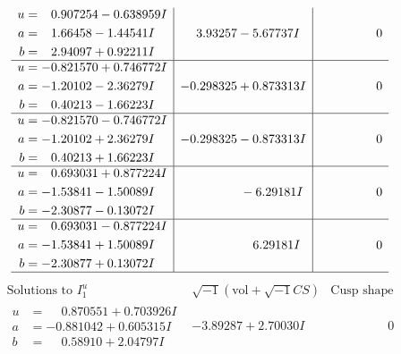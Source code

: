 \documentclass[1p]{elsarticle_modified}
\theoremstyle{definition}
\newcommand{\I}{\sqrt{-1}}
\begin{document}
$$\begin{array}{c|c|c}
\begin{aligned}
u &= \phantom{-}0.907254 - 0.638959 I \\
a &= \phantom{-}1.66458 - 1.44541 I \\
b &= \phantom{-}2.94097 + 0.92211 I\end{aligned}
 & \phantom{-}3.93257 - 5.67737 I & \phantom{-0.000000 } 0 \\ \hline\begin{aligned}
u &= -0.821570 + 0.746772 I \\
a &= -1.20102 - 2.36279 I \\
b &= \phantom{-}0.40213 - 1.66223 I\end{aligned}
 & -0.298325 + 0.873313 I & \phantom{-0.000000 } 0 \\ \hline\begin{aligned}
u &= -0.821570 - 0.746772 I \\
a &= -1.20102 + 2.36279 I \\
b &= \phantom{-}0.40213 + 1.66223 I\end{aligned}
 & -0.298325 - 0.873313 I & \phantom{-0.000000 } 0 \\ \hline\begin{aligned}
u &= \phantom{-}0.693031 + 0.877224 I \\
a &= -1.53841 - 1.50089 I \\
b &= -2.30877 - 0.13072 I\end{aligned}
 & \phantom{-0.000000 } -6.29181 I & \phantom{-0.000000 } 0 \\ \hline\begin{aligned}
u &= \phantom{-}0.693031 - 0.877224 I \\
a &= -1.53841 + 1.50089 I \\
b &= -2.30877 + 0.13072 I\end{aligned}
 & \phantom{-0.000000 -}6.29181 I & \phantom{-0.000000 } 0\\
 \hline 
 \end{array}$$\newpage$$\begin{array}{c|c|c}  
\text{Solutions to }I^u_{1}& \I (\text{vol} + \sqrt{-1}CS) & \text{Cusp shape}\\
 \hline 
\begin{aligned}
u &= \phantom{-}0.870551 + 0.703926 I \\
a &= -0.881042 + 0.605315 I \\
b &= \phantom{-}0.58910 + 2.04797 I\end{aligned}
 & -3.89287 + 2.70030 I & \phantom{-0.000000 } 0 \\ \hline\begin{aligned}

\end{aligned}
\end{array}$$
\end{document}
